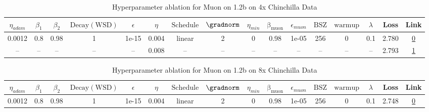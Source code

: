 \begin{table}[H]
\centering
\caption{Hyperparameter ablation for Muon on 1.2b on 4x Chinchilla Data}
\label{tab:ablation_muon_1.2b_on_4x_chinchilla_data}
\begin{tabular}{cccccccccccccccc}
\toprule
$\eta_{adam}$ & $\beta_1$ & $\beta_2$ & $\mathrm{Decay (WSD)}$ & $\epsilon$ & $\eta$ & $\mathrm{Schedule}$ & $\gradnorm$ & $\eta_{min}$ & $\mathrm{\beta_{muon}}$ & $\epsilon_{muon}$ & $\mathrm{BSZ}$ & $\mathrm{warmup}$ & $\lambda$ & Loss & Link \\
\midrule
0.0012 & 0.8 & 0.98 & 1 & 1e-15 & 0.004 & linear & 2 & 0 & 0.98 & 1e-05 & 256 & 0 & 0.1 & 2.780 & \href{https://wandb.ai/stanford-mercury/optimizer-scaling/runs/sweep-1.2b-96B-muon5ad2a1lr0.004-wd0.1-minlr0.0-warmup0.0-b10.8--05a146}{0} \\
\midrule
-- & -- & -- & -- & -- & 0.008 & -- & -- & -- & -- & -- & -- & -- & -- & 2.793 & \href{https://wandb.ai/stanford-mercury/optimizer-scaling/runs/sweep-1.2b-96B-muonforced13606lr0.008-wd0.1-minlr0.0-warmup0.0-b-fc19f3}{1} \\
\bottomrule
\end{tabular}
\end{table}

\begin{table}[H]
\centering
\caption{Hyperparameter ablation for Muon on 1.2b on 8x Chinchilla Data}
\label{tab:ablation_muon_1.2b_on_8x_chinchilla_data}
\begin{tabular}{cccccccccccccccc}
\toprule
$\eta_{adam}$ & $\beta_1$ & $\beta_2$ & $\mathrm{Decay (WSD)}$ & $\epsilon$ & $\eta$ & $\mathrm{Schedule}$ & $\gradnorm$ & $\eta_{min}$ & $\mathrm{\beta_{muon}}$ & $\epsilon_{muon}$ & $\mathrm{BSZ}$ & $\mathrm{warmup}$ & $\lambda$ & Loss & Link \\
\midrule
0.0012 & 0.8 & 0.98 & 1 & 1e-15 & 0.004 & linear & 2 & 0 & 0.98 & 1e-05 & 256 & 0 & 0.1 & 2.748 & \href{https://wandb.ai/stanford-mercury/optimizer-scaling/runs/sweep-1.2b-193B-muon4a7234lr0.004-wd0.1-minlr0.0-warmup0.0-b10.8-2335ab}{0} \\
\midrule
\bottomrule
\end{tabular}
\end{table}

